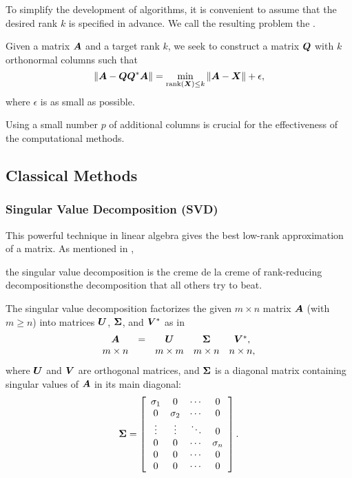 \documentclass[12pt]{article}
\begin{document}
To simplify the development of algorithms, it is convenient to assume
that the desired rank $k$ is specified in advance.
We call the resulting problem the .  
\begin{problem}
Given a matrix $\bm{A}$ and a target rank $k$,
we seek to construct a matrix $\bm{Q}$ with $k$ orthonormal columns such that
\begin{equation}
\label{eq:fixed_rank}
\left\Vert { \bm{A} - \bm{Q}\bm{Q}^{*}\bm{A} } \right\Vert =
\min_{{\rm rank}(\bm{X}) \leq k}\left\Vert { \bm{A} - \bm{X} } \right\Vert + \epsilon,
\end{equation}
where $\epsilon$ is as small as possible.
\end{problem}
Using a small number $p$ of additional columns is crucial for the effectiveness of the computational methods.

\subsection{Classical Methods}
\label{sec:classic}

\subsubsection{Singular Value Decomposition (SVD)}
\label{sec:svd}

This powerful technique in linear algebra gives the best
low-rank approximation of a matrix. As mentioned in \cite{Stewartbook},
\begin{displayquote}
the singular value decomposition is the creme de la creme of rank-reducing decompositions\textemdash the decomposition that all others try to beat.
\end{displayquote}

The singular value decomposition factorizes the given $m \times n$ matrix $\bm{A}$ (with $m \geq n$) into matrices $\bm{U}$, $\bm{\Sigma}$, and $\bm{V}^{*}$ as in
\begin{equation}
\label{eq:svd}
\begin{array}{ccccccccccc}
\bm{A} &=& \bm{U} & \bm{\Sigma} & \bm{V}^{*},\\
m \times n && m \times m & m \times n & n \times n,
\end{array}
\end{equation}
where $\bm{U}$ and $\bm{V}$ are orthogonal matrices, and $\bm{\Sigma}$ is a diagonal matrix containing singular values of $\bm{A}$ in its main diagonal:
\[
\bm{\Sigma}=\left[\begin{array}{cccc}
\sigma_{1} & 0 & \cdots & 0\\
0 & \sigma_{2} & \cdots & 0\\
\vdots & \vdots & \ddots & 0\\
0 & 0 & \cdots & \sigma_{n}\\
0 & 0 & \cdots & 0\\
0 & 0 & \cdots & 0
\end{array}\right].
\]
\end{document}
